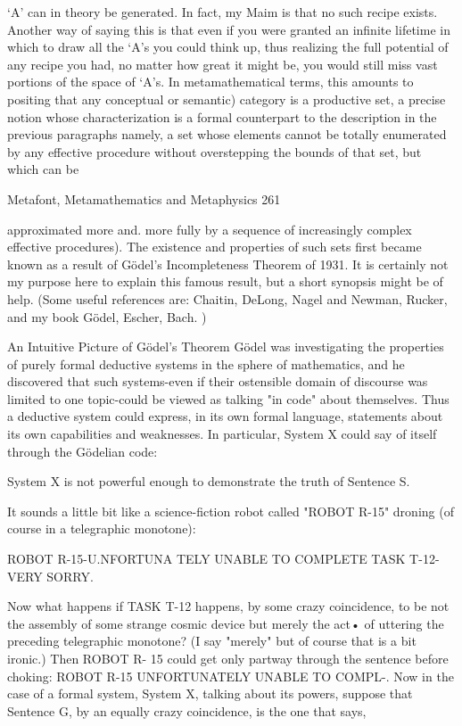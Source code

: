 `A' can in theory be generated. In fact, my Maim is that no such recipe exists. Another
way of saying this is that even if you were granted an infinite lifetime in which to draw
all the `A's you could think up, thus realizing the full potential of any recipe you had, no
matter how great it might be, you would still miss vast portions of the space of `A's.
    In metamathematical terms, this amounts to positing that any conceptual or semantic)
category is a productive set, a precise notion whose characterization is a formal
counterpart to the description in the previous paragraphs namely, a set whose elements
cannot be totally enumerated by any effective procedure without overstepping the bounds
of that set, but which can be




Metafont, Metamathematics and Metaphysics                                                 261

approximated more and. more fully by a sequence of increasingly complex effective
procedures). The existence and properties of such sets first became known as a result of
Gödel’s Incompleteness Theorem of 1931. It is certainly not my purpose here to explain
this famous result, but a short synopsis might be of help. (Some useful references are:
Chaitin, DeLong, Nagel and Newman, Rucker, and my book Gödel, Escher, Bach. )

                   An Intuitive Picture of Gödel’s Theorem
   Gödel was investigating the properties of purely formal deductive systems in the
sphere of mathematics, and he discovered that such systems-even if their ostensible
domain of discourse was limited to one topic-could be viewed as talking "in code" about
themselves. Thus a deductive system could express, in its own formal language,
statements about its own capabilities and weaknesses. In particular, System X could say
of itself through the Gödelian code:

        System X is not powerful enough to demonstrate the truth of Sentence S.

It sounds a little bit like a science-fiction robot called "ROBOT R-15" droning (of course
in a telegraphic monotone):

       ROBOT R-15-U.NFORTUNA TELY UNABLE TO COMPLETE TASK T-12-VERY
       SORRY.

Now what happens if TASK T-12 happens, by some crazy coincidence, to be not the
assembly of some strange cosmic device but merely the act• of uttering the preceding
telegraphic monotone? (I say "merely" but of course that is a bit ironic.) Then ROBOT R-
15 could get only partway through the sentence before choking: ROBOT R-15
UNFORTUNATELY UNABLE TO COMPL-.
   Now in the case of a formal system, System X, talking about its powers, suppose that
Sentence G, by an equally crazy coincidence, is the one that says,

